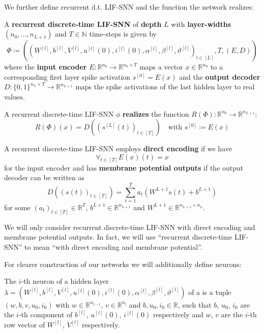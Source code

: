 We further define recurrent d.t. LIF-SNN and the function the network realizes:
\begin{definition}
  A \textbf{recurrent discrete-time LIF-SNN} of \textbf{depth} \(L\) with \textbf{layer-widths} \((n_0,…,n_{L+1})\) and \(T∈ℕ\) time-steps is given by
  \[ Φ≔((W^{[l]},b^{[l]},V^{[l]},u^{[l]}(0),i^{[l]}(0),α^{[l]},β^{[l]},ϑ^{[l]})_{l∈[L]},T,(E,D)) \]
  where the \textbf{input encoder} \(E:ℝ^{n_0}→ℝ^{n_0×T}\) maps a vector \(x∈ℝ^{n_0}\) to a corresponding first layer spike activation \(s^{[0]}=E(x)\) and the \textbf{output decoder} \(D:\{0,1\}^{n_L×T}→ℝ^{n_{L+1}}\) maps the spike activations of the last hidden layer to real values.
\end{definition}


\begin{definition}
  A recurrent discrete-time LIF-SNN \(ϕ\) \textbf{realizes} the function \(R(Φ):ℝ^{n_0}→ℝ^{n_{L+1}}\):
  \[ R(Φ)(x)=D((s^{[L]}(t))_{t∈[T]})\quad \text{with }s^{[0]}≔E(x)\]
\end{definition}

\begin{definition}
  A recurrent discrete-time LIF-SNN employs \textbf{direct encoding} if we have
  \[ ∀_{t∈[T]}E(x)(t)=x \]
  for the input encoder and has \textbf{membrane potential outputs} if the output decoder can be written as
  \[ D((s(t))_{t∈[T]})=\sum_{t=1}^Ta_t(W^{L+1}s(t)+b^{L+1}) \]
  for some \((a_t)_{t∈[T]}∈ℝ^T\), \(b^{L+1}∈ℝ^{n_{L+1}}\) and \(W^{L+1}∈ℝ^{n_{L+1}×n_L}\).
\end{definition}
We will only consider recurrent discrete-time LIF-SNN with direct encoding and membrane potential outputs. In fact, we will use “recurrent discrete-time LIF-SNN” to mean “\rdtlifsnn with direct encoding and membrane potential”.

For clearer construction of our networks we will additionally define neurons:

\begin{definition}
  The \(i\)-th neuron of a hidden layer \(λ=(W^{[l]},b^{[l]},V^{[l]},u^{[l]}(0),i^{[l]}(0),α^{[l]},β^{[l]},ϑ^{[l]})\) of a \rdtlifsnn is a tuple \((w,b,v,u_0,i_0)\) with \(w∈ℝ^{n_{l-1}}\), \(v∈ℝ^{n_l}\) and \(b,u_0,i_0∈ℝ\), such that \(b\), \(u_0\), \(i_0\) are the \(i\)-th component of \(b^{[l]}\), \(u^{[l]}(0)\), \(i^{[l]}(0)\) respectively and \(w\), \(v\) are the \(i\)-th row vector of \(W^{[l]}\), \(V^{[l]}\) respectively.
\end{definition}

